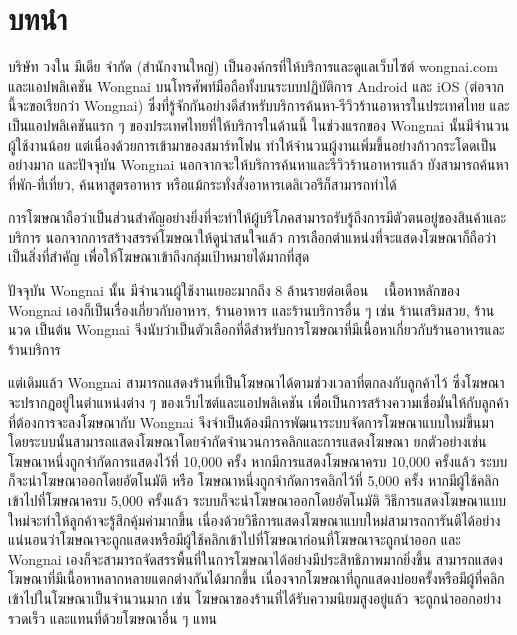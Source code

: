 \chapter{บทนำ}
\label{chapter:introduction}

บริษัท วงใน มีเดีย จำกัด (สำนักงานใหญ่) เป็นองค์กรที่ให้บริการและดูแลเว็บไซต์ wongnai.com และแอปพลิเคชัน Wongnai บนโทรศัพท์มือถือทั้งบนระบบปฏิบัติการ Android และ iOS (ต่อจากนี้จะขอเรียกว่า Wongnai) ซึ่งที่รู้จักกันอย่างดีสำหรับบริการค้นหา-รีวิวร้านอาหารในประเทศไทย และเป็นแอปพลิเคชันแรก ๆ ของประเทศไทยที่ให้บริการในด้านนี้ ในช่วงแรกของ Wongnai นั้นมีจำนวนผู้ใช้งานน้อย แต่เนื่องด้วยการเข้ามาของสมาร์ทโฟน ทำให้จำนวนผู้งานเพิ่มขึ้นอย่างก้าวกระโดดเป็นอย่างมาก และปัจจุบัน Wongnai นอกจากจะให้บริการค้นหาและรีวิวร้านอาหารแล้ว ยังสามารถค้นหาที่พัก-ที่เที่ยว, ค้นหาสูตรอาหาร หรือแม้กระทั่งสั่งอาหารเดลิเวอรีก็สามารถทำได้

การโฆษณาถือว่าเป็นส่วนสำคัญอย่างยิ่งที่จะทำให้ผู้บริโภคสามารถรับรู้ถึงการมีตัวตนอยู่ของสินค้าและบริการ นอกจากการสร้างสรรค์โฆษณาให้ดูน่าสนใจแล้ว การเลือกตำแหน่งที่จะแสดงโฆษณาก็ถือว่าเป็นสิ่งที่สำคัญ เพื่อให้โฆษณาเข้าถึงกลุ่มเป้าหมายได้มากที่สุด

ปัจจุบัน Wongnai นั้น มีจำนวนผู้ใช้งานเยอะมากถึง 8 ล้านรายต่อเดือน ~\cite{wongnai} เนื้อหาหลักของ Wongnai เองก็เป็นเรื่องเกี่ยวกับอาหาร, ร้านอาหาร และร้านบริการอื่น ๆ เช่น ร้านเสริมสวย, ร้านนวด เป็นต้น Wongnai จึงนับว่าเป็นตัวเลือกที่ดีสำหรับการโฆษณาที่มีเนื้อหาเกี่ยวกับร้านอาหารและร้านบริการ

แต่เดิมแล้ว Wongnai สามารถแสดงร้านที่เป็นโฆษณาได้ตามช่วงเวลาที่ตกลงกับลูกค้าไว้ ซึ่งโฆษณาจะปรากฏอยู่ในตำแหน่งต่าง ๆ ของเว็บไซต์และแอปพลิเคชัน
เพื่อเป็นการสร้างความเชื่อมั่นให้กับลูกค้าที่ต้องการจะลงโฆษณากับ Wongnai จึงจำเป็นต้องมีการพัฒนาระบบจัดการโฆษณาแบบใหม่ขึ้นมา โดยระบบนั้นสามารถแสดงโฆษณาโดยจำกัดจำนวนการคลิกและการแสดงโฆษณา ยกตัวอย่างเช่น โฆษณาหนึ่งถูกจำกัดการแสดงไว้ที่ 10,000 ครั้ง หากมีการแสดงโฆษณาครบ 10,000 ครั้งแล้ว ระบบก็จะนำโฆษณาออกโดยอัตโนมัติ หรือ โฆษณาหนึ่งถูกจำกัดการคลิกไว้ที่ 5,000 ครั้ง หากมีผู้ใช้คลิกเข้าไปที่โฆษณาครบ 5,000 ครั้งแล้ว ระบบก็จะนำโฆษณาออกโดยอัตโนมัติ วิธีการแสดงโฆษณาแบบใหม่จะทำให้ลูกค้าจะรู้สึกคุ้มค่ามากขึ้น เนื่องด้วยวิธีการแสดงโฆษณาแบบใหม่สามารถการันตีได้อย่างแน่นอนว่าโฆษณาจะถูกแสดงหรือมีผู้ใช้คลิกเข้าไปที่โฆษณาก่อนที่โฆษณาจะถูกนำออก และ Wongnai เองก็จะสามารถจัดสรรพื้นที่ในการโฆษณาได้อย่างมีประสิทธิภาพมากยิ่งขึ้น สามารถแสดงโฆษณาที่มีเนื้อหาหลากหลายแตกต่างกันได้มากขึ้น เนื่องจากโฆษณาที่ถูกแสดงบ่อยครั้งหรือมีผู้ที่คลิกเข้าไปในโฆษณาเป็นจำนวนมาก เช่น โฆษณาของร้านที่ได้รับความนิยมสูงอยู่แล้ว จะถูกนำออกอย่างรวดเร็ว และแทนที่ด้วยโฆษณาอื่น ๆ แทน

